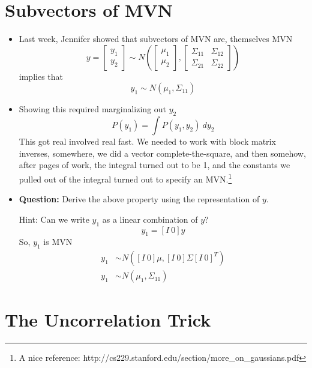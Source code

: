 \documentclass[12pt]{article}
\begin{document}
\section{Subvectors of MVN}
\begin{itemize}
	\item Last week, Jennifer showed that subvectors of MVN are, themselves MVN
	\begin{equation*}
	y = \left[ \begin{array}{c} y_1 \\ y_2 \end{array} \right] \sim N \left(
	\left[ \begin{array}{c} \mu_1 \\ \mu_2 \end{array} \right],
	\left[
	\begin{array}{cc}
	\Sigma_{11} & \Sigma_{12} \\
	\Sigma_{21} & \Sigma_{22}
	\end{array}
	\right]
	\right)
	\end{equation*}
	implies that $$y_1 \sim N(\mu_1, \Sigma_{11})$$
	
	\item Showing this required marginalizing out $y_2$
	$$P(y_1) = \int P(y_1,y_2) \ d y_2$$
	This got real involved real fast. We needed to work with block matrix inverses, somewhere, we did a vector complete-the-square, and then somehow, after pages of work, the integral turned out to be 1, and the constants we pulled out of the integral turned out to specify an MVN.\footnote{A nice reference: http://cs229.stanford.edu/section/more\_on\_gaussians.pdf}
	
	\item \textbf{Question:} Derive the above property using the representation of $y$.
	
	Hint: Can we write $y_1$ as a linear combination of $y$?
	$$y_1 = \left[ I \ 0\right] y $$
	So, $y_1$ is MVN
	\begin{align*}
		y_1 &\sim N (\left[ I \ 0\right] \mu, \left[ I \ 0\right] \Sigma \left[ I \ 0\right]^T) \\
		y_1 &\sim N(\mu_1, \Sigma_{11})
	\end{align*}
	
	
\end{itemize}




\newpage

\section{The Uncorrelation Trick}
\end{document}
